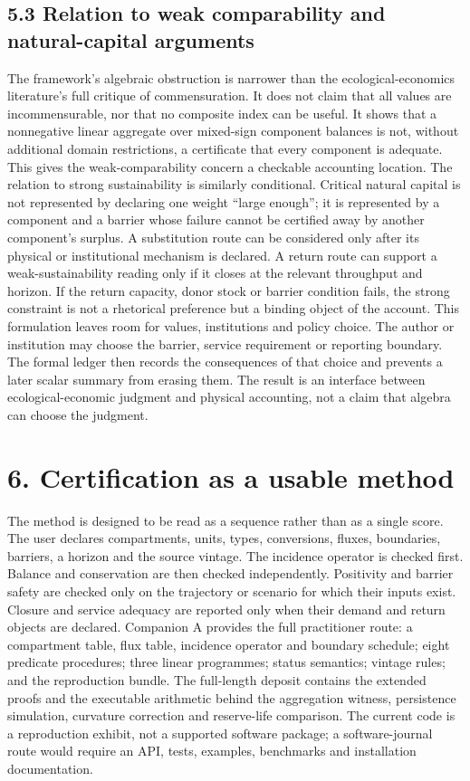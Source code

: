 \documentclass[11pt]{article}
\begin{document}
\subsection{5.3 Relation to weak comparability and natural-capital arguments}
The framework's algebraic obstruction is narrower than the ecological-economics literature's full critique of commensuration. It does not claim that all values are incommensurable, nor that no composite index can be useful. It shows that a nonnegative linear aggregate over mixed-sign component balances is not, without additional domain restrictions, a certificate that every component is adequate. This gives the weak-comparability concern a checkable accounting location.
The relation to strong sustainability is similarly conditional. Critical natural capital is not represented by declaring one weight ``large enough''; it is represented by a component and a barrier whose failure cannot be certified away by another component's surplus. A substitution route can be considered only after its physical or institutional mechanism is declared. A return route can support a weak-sustainability reading only if it closes at the relevant throughput and horizon. If the return capacity, donor stock or barrier condition fails, the strong constraint is not a rhetorical preference but a binding object of the account.
This formulation leaves room for values, institutions and policy choice. The author or institution may choose the barrier, service requirement or reporting boundary. The formal ledger then records the consequences of that choice and prevents a later scalar summary from erasing them. The result is an interface between ecological-economic judgment and physical accounting, not a claim that algebra can choose the judgment.
\section{6. Certification as a usable method}
The method is designed to be read as a sequence rather than as a single score. The user declares compartments, units, types, conversions, fluxes, boundaries, barriers, a horizon and the source vintage. The incidence operator is checked first. Balance and conservation are then checked independently. Positivity and barrier safety are checked only on the trajectory or scenario for which their inputs exist. Closure and service adequacy are reported only when their demand and return objects are declared.
Companion A provides the full practitioner route: a compartment table, flux table, incidence operator and boundary schedule; eight predicate procedures; three linear programmes; status semantics; vintage rules; and the reproduction bundle. The full-length deposit contains the extended proofs and the executable arithmetic behind the aggregation witness, persistence simulation, curvature correction and reserve-life comparison. The current code is a reproduction exhibit, not a supported software package; a software-journal route would require an API, tests, examples, benchmarks and installation documentation.
\end{document}
